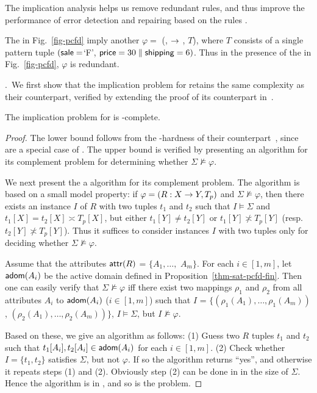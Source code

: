 The implication analysis helps us
remove redundant rules, and thus improve the
performance of error detection and repairing based on
the rules \cite{CFDs,tcs-CINDs}.

\begin{example}
\label{exa-implication} The \pCFDs in Fig.~\ref{fig-pcfd} imply
another \pCFD $\varphi =$ (,  $\rightarrow$
, $T$), where $T$ consists of a single pattern tuple
$(\protect\mathsf{sale} = $`F', $\protect\mathsf{price} = 30 \parallel \protect\mathsf{shipping} = 6)$. Thus
in the presence of the \pCFDs in Fig.~\ref{fig-pcfd}, $\varphi$ is
redundant.
\end{example}
\vspace{-1ex}

.~We first show that
the implication problem for \pCFDs retains
the same complexity as their \CFDs counterpart, verified by
extending the proof of its counterpart in~\cite{CFDs}.

\begin{prop}
\label{thm-imp-pcfd-fin} The implication problem for \pCFDs is
\coNP-complete.
\end{prop}



\begin{proof}
The lower bound follows from the
\coNP-hardness of their \CFDs counterpart~\cite{CFDs}, since \CFDs
are a special case of \pCFDs. The \coNP upper bound is verified
by presenting an \NP algorithm for its complement problem for determining whether $\Sigma\not\models\varphi$.



We next present the a \NP algorithm
for its complement problem. The algorithm is based on a small model
property: if $\varphi = (R: X \rightarrow Y, T_p)$ and $\Sigma
\not\models\varphi$, then there exists an instance $I$ of $R$ with
two tuples $t_1$ and $t_2$ such that $I\models\Sigma$ and $t_1[X] =
t_2[X] \asymp T_p[X]$, but either $t_1[Y]\ne t_2[Y]$ or
$t_1[Y]\not\asymp T_p[Y]$ (resp. $t_2[Y]\not\asymp T_p[Y]$). Thus it
suffices to consider instances $I$ with two tuples only for deciding
whether $\Sigma\not\models\varphi$.

Assume that the attributes $\protect\mathsf{attr}(R)$ = $\{A_1,\dots,$
$A_m\}$. For each $i\in [1, m]$, let ${\mathsf{adom}}(A_i)$ be the active domain defined in
Proposition~\ref{thm-sat-pcfd-fin}. Then one can easily verify that
$\Sigma\not\models\varphi$ iff there exist two mappings $\rho_1$ and
$\rho_2$ from all attributes $A_i$ to ${\mathsf{adom}}(A_i)$ ($i\in [1, m]$) such that $I$
= $\{(\rho_1(A_1), \ldots, \rho_1(A_m))$, $(\rho_2(A_1),
\ldots, \rho_2(A_m))\}$, $I \models\Sigma$, but
$I\not\models\varphi$.

Based on these, we give an \NP algorithm as follows: (1) Guess two
$R$ tuples $t_1$ and $t_2$ such that $t_1[A_i],t_2[A_i]
\in{\ensuremath {\mathsf{adom}}}(A_i)$ for each $i \in [1, m]$. (2) Check whether $I =
\{t_1, t_2\}$ satisfies $\Sigma$, but not $\varphi$. If so the
algorithm returns ``yes'', and otherwise it repeats steps (1) and
(2). Obviously step (2) can be done in \PTIME in the size of $\Sigma$.
Hence the algorithm is in \NP, and so is the problem.
\end{proof}

